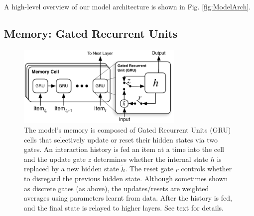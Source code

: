 \documentclass{sig-alternate-05-2015}
\begin{document}
A high-level overview of our model architecture is shown in Fig. \ref{fig:ModelArch}. 

\subsection{Memory: Gated Recurrent Units}
\begin{figure}
\centering
	\includegraphics[width=8cm]{images/GRU}
	\caption{The model's memory is composed of Gated Recurrent Units (GRU) cells that selectively update or reset their hidden states via two gates. An interaction history is fed an item at a time into the cell and the update gate $z$ determines whether the internal state $h$ is replaced by a new hidden state $\tilde{h}$. The reset gate $r$ controls whether to disregard the previous hidden state. Although sometimes shown as discrete gates (as above), the updates/resets are weighted averages using parameters learnt from data. After the history is fed, and the final state is relayed to higher layers. See text for  details. }
	\label{fig:GRU}
\end{figure}
\end{document}
